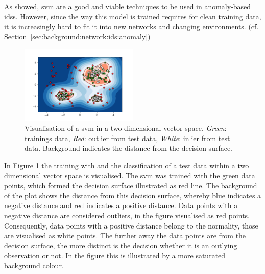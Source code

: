 As \textcite{Eskin2002,Lazarevic2003} showed, \gls{svm} are a good and viable techniques to be used in anomaly-based \glspl{ids}. However, since the way this model is trained requires for clean training data, it is increasingly hard to fit it into new networks and changing environments. (cf. Section~\ref{sec:background:network:ids:anomaly})

\begin{figure}
	\centering
	\vspace{-18pt}
	\includegraphics[width=0.5\textwidth,trim={12mm 5mm 15mm 10mm},keepaspectratio,clip]{figures/200-background-oneclass.pdf}
	\caption[Example visualisation of a Support Vector Machine]{Visualisation of a \gls{svm} in a two dimensional vector space. \emph{Green}: trainings data, \emph{Red}: outlier from test data, \emph{White}: inlier from test data. Background indicates the distance from the decision surface.}
	\label{fig:background:network:novelty:svm}
	\vspace{-20pt}
\end{figure}

In Figure \ref{fig:background:network:novelty:svm} the training with and the classification of a test data within a two dimensional vector space is visualised. The \gls{svm} was trained with the green data points, which formed the decision surface illustrated as red line. The background of the plot shows the distance from this decision surface, whereby blue indicates a negative distance and red indicates a positive distance.
Data points with a negative distance are considered outliers, in the figure visualised as red points. Consequently, data points with a positive distance belong to the normality, those are visualised as white points.
The further away the data points are from the decision surface, the more distinct is the decision whether it is an outlying observation or not. In the figure this is illustrated by a more saturated background colour.

